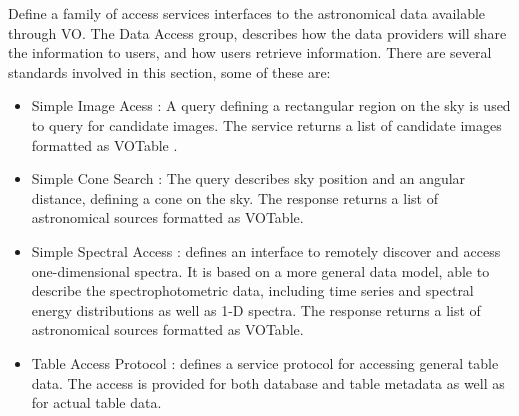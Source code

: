 Define a family of access services interfaces to the astronomical data
available through VO. The Data Access group, describes how the data providers
will share the information to users, and how users retrieve information. There
are several standards involved in this section, some of these are:
\begin{itemize}
	\item Simple Image Acess \cite{sia}: A query defining a rectangular
region on the sky is used to query for candidate images. The service returns a
list of candidate images formatted as VOTable \cite{votable}.
	\item Simple Cone Search \cite{scs}: The query describes sky position
and an angular distance, defining a cone on the sky. The response returns a
list of astronomical sources formatted as VOTable.
	\item Simple Spectral Access \cite{ssa}: defines an interface to
remotely discover and access one-dimensional spectra. It is based on a more
general data model, able to describe the spectrophotometric data, including
time series and spectral energy distributions as well as 1-D spectra. The
response returns a list of astronomical sources formatted as VOTable.
	\item Table Access Protocol \cite{tap}: defines a service protocol for
accessing general table data. The access is provided for both database and
table metadata as well as for actual table data.
\end{itemize}
